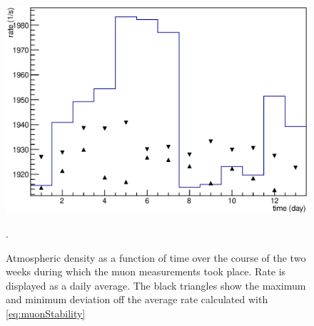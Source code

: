   \begin{figure}
	\centering
  	\includegraphics[width = 0.9 \textwidth]{graphics/setup/rateWeather.eps}
  	\caption[Daily Average Muon Rate]{Atmospheric density as a function of time over the course of the two weeks during which the muon measurements took place. Rate is displayed as a daily average. The black triangles show the maximum and minimum deviation off the average rate calculated with \ref{eq:muonStability}}.
  	\label{fig:moduleStability}
  \end{figure}

